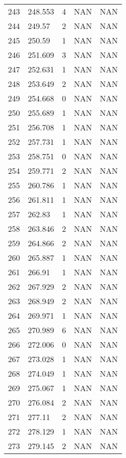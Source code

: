 \documentclass{article}
\begin{document}
\begin{longtable}{@{}lllll@{}}
					243 & 248.553 & 4     & NAN   & NAN   \\
					244 & 249.57  & 2     & NAN   & NAN   \\
					245 & 250.59  & 1     & NAN   & NAN   \\
					246 & 251.609 & 3     & NAN   & NAN   \\
					247 & 252.631 & 1     & NAN   & NAN   \\
					248 & 253.649 & 2     & NAN   & NAN   \\
					249 & 254.668 & 0     & NAN   & NAN   \\
					250 & 255.689 & 1     & NAN   & NAN   \\
					251 & 256.708 & 1     & NAN   & NAN   \\
					252 & 257.731 & 1     & NAN   & NAN   \\
					253 & 258.751 & 0     & NAN   & NAN   \\
					254 & 259.771 & 2     & NAN   & NAN   \\
					255 & 260.786 & 1     & NAN   & NAN   \\
					256 & 261.811 & 1     & NAN   & NAN   \\
					257 & 262.83  & 1     & NAN   & NAN   \\
					258 & 263.846 & 2     & NAN   & NAN   \\
					259 & 264.866 & 2     & NAN   & NAN   \\
					260 & 265.887 & 1     & NAN   & NAN   \\
					261 & 266.91  & 1     & NAN   & NAN   \\
					262 & 267.929 & 2     & NAN   & NAN   \\
					263 & 268.949 & 2     & NAN   & NAN   \\
					264 & 269.971 & 1     & NAN   & NAN   \\
					265 & 270.989 & 6     & NAN   & NAN   \\
					266 & 272.006 & 0     & NAN   & NAN   \\
					267 & 273.028 & 1     & NAN   & NAN   \\
					268 & 274.049 & 1     & NAN   & NAN   \\
					269 & 275.067 & 1     & NAN   & NAN   \\
					270 & 276.084 & 2     & NAN   & NAN   \\
					271 & 277.11  & 2     & NAN   & NAN   \\
					272 & 278.129 & 1     & NAN   & NAN   \\
					273 & 279.145 & 2     & NAN   & NAN   \\

\end{longtable}
\end{document}
